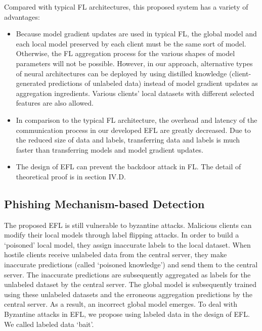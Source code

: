 \documentclass[lettersize,journal]{IEEEtran}
\begin{document}
\par Compared with typical FL architectures, this proposed system has a variety of advantages:
\begin{itemize}

\item Because model gradient updates are used in typical FL, the global model and each local model preserved by each client must be the same sort of model. Otherwise, the FL aggregation process for the various shapes of model parameters will not be possible. However, in our approach, alternative types of neural architectures can be deployed by using distilled knowledge (client-generated predictions of unlabeled data) instead of model gradient updates as aggregation ingredients. Various clients' local datasets with different selected features are also allowed.
\item In comparison to the typical FL architecture, the overhead and latency of the communication process in our developed EFL are greatly decreased. Due to the reduced size of data and labels, transferring data and labels is much faster than transferring models and model gradient updates.
\item The design of EFL can prevent the backdoor attack in FL. The detail of theoretical proof is in section IV.D.
\end{itemize}
    


\subsection{Phishing Mechanism-based Detection}
The proposed EFL is still vulnerable to byzantine attacks. Malicious clients can modify their local models through label flipping attacks. In order to build a `poisoned' local model, they assign inaccurate labels to the local dataset. When hostile clients receive unlabeled data from the central server, they make inaccurate predictions (called `poisoned knowledge') and send them to the central server. The inaccurate predictions are subsequently aggregated as labels for the unlabeled dataset by the central server. The global model is subsequently trained using these unlabeled datasets and the erroneous aggregation predictions by the central server. As a result, an incorrect global model emerges. To deal with Byzantine attacks in EFL, we propose using labeled data in the design of EFL. We called labeled data `bait'.
\end{document}
